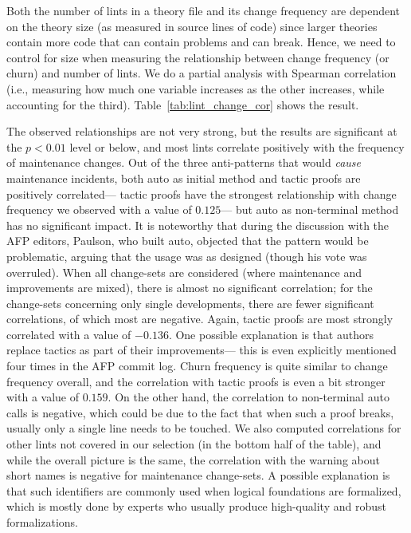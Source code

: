 Both the number of lints in a theory file and its change frequency are dependent on the theory size 
(as measured in source lines of code)
since larger theories contain more code that can contain problems and can break.
Hence, we need to control for size when measuring the relationship between change frequency (or churn) and number of lints.
We do a partial analysis with Spearman correlation
(i.e., measuring how much one variable increases as the other increases, while accounting for the third).
Table~\ref{tab:lint_change_cor} shows the result.

The observed relationships are not very strong,
but the results are significant at the $p<0.01$ level or below,
and most lints correlate positively with the frequency of maintenance changes.
Out of the three anti-patterns that would \emph{cause} maintenance incidents,
both auto as initial method and tactic proofs are positively correlated---%
tactic proofs have the strongest relationship with change frequency we observed with a value of $0.125$---%
but auto as non-terminal method has no significant impact.
It is noteworthy that during the discussion with the AFP editors,
Paulson, who built auto, objected that the pattern would be problematic,
arguing that the usage was as designed (though his vote was overruled).
When all change-sets are considered
(where maintenance and improvements are mixed),
there is almost no significant correlation;
for the change-sets concerning only single developments,
there are fewer significant correlations,
of which most are negative.
Again, tactic proofs are most strongly correlated with a value of $-0.136$.
One possible explanation is that authors replace tactics as part of their improvements---%
this is even explicitly mentioned four times in the AFP commit log.
Churn frequency is quite similar to change frequency overall,
and the correlation with tactic proofs is even a bit stronger with a value of $0.159$.
On the other hand, the correlation to non-terminal auto calls is negative,
which could be due to the fact that when such a proof breaks,
usually only a single line needs to be touched.
We also computed correlations for other lints not covered in our selection
(in the bottom half of the table),
and while the overall picture is the same,
the correlation with the warning about short names is negative for maintenance change-sets.
A possible explanation is that such identifiers are commonly used when logical foundations are formalized,
which is mostly done by experts who usually produce high-quality and robust formalizations.

